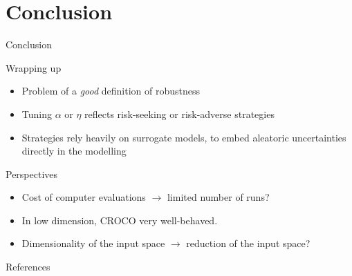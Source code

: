 \documentclass[10pt,aspectratio=169,usepdftitle=false]{beamer}
\begin{document}
\section{Conclusion}

\begin{frame}[label=conclusion]{Conclusion}
  
  \begin{block}{Wrapping up}
    \begin{itemize}
    \item Problem of a \emph{good} definition of robustness
    \item Tuning $\alpha$ or $\eta$ reflects risk-seeking or
      risk-adverse strategies
    \item Strategies rely heavily on surrogate models, to embed
      aleatoric uncertainties directly in the modelling
    \end{itemize}
  \end{block}


  \begin{block}{Perspectives}
    \begin{itemize}
    \item Cost of computer evaluations $\rightarrow$ limited number of
      runs?
    \item In low dimension, CROCO very well-behaved.
    \item Dimensionality of the input space $\rightarrow$ reduction of
      the input space?
    \end{itemize}
  \end{block}
\end{frame}


\begin{frame}[allowframebreaks]{References}
  \renewcommand{\bibsection}{}

  
\end{frame}

\appendix
\end{document}
